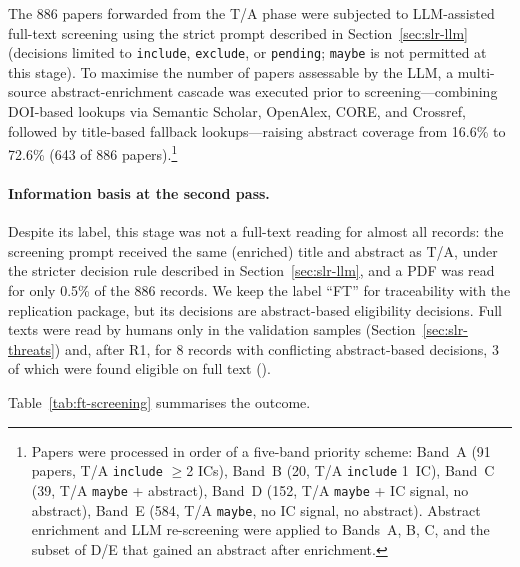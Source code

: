 The 886 papers forwarded from the T/A phase were subjected to LLM-assisted
full-text screening using the strict prompt described in
Section~\ref{sec:slr-llm} (decisions limited to \texttt{include},
\texttt{exclude}, or \texttt{pending}; \texttt{maybe} is not permitted at this
stage). To maximise the number of papers assessable by the LLM, a
multi-source abstract-enrichment cascade was executed prior to
screening---combining DOI-based lookups via Semantic Scholar, OpenAlex, CORE,
and Crossref, followed by title-based fallback lookups---raising abstract
coverage from 16.6\% to 72.6\% (643 of 886 papers).\footnote{Papers were
  processed in order of a five-band priority scheme: Band~A (91 papers,
  T/A \texttt{include} $\geq$2 ICs), Band~B (20, T/A \texttt{include} 1~IC),
  Band~C (39, T/A \texttt{maybe} + abstract), Band~D (152, T/A \texttt{maybe}
  + IC signal, no abstract), Band~E (584, T/A \texttt{maybe}, no IC signal, no
  abstract). Abstract enrichment and LLM re-screening were applied to Bands~A,
  B, C, and the subset of D/E that gained an abstract after enrichment.}

\paragraph{Information basis at the second pass.} Despite its label, this
stage was not a full-text reading for almost all records: the screening
prompt received the same (enriched) title and abstract as T/A, under the
stricter decision rule described in Section~\ref{sec:slr-llm}, and a PDF was
read for only 0.5\% of the 886 records. We keep the label ``FT'' for
traceability with the replication package, but its decisions are
abstract-based eligibility decisions. Full texts were read by humans only in
the validation samples (Section~\ref{sec:slr-threats}) and, after R1, for 8
records with conflicting abstract-based decisions, 3 of which were found
eligible on full text ().

Table~\ref{tab:ft-screening} summarises the outcome.

